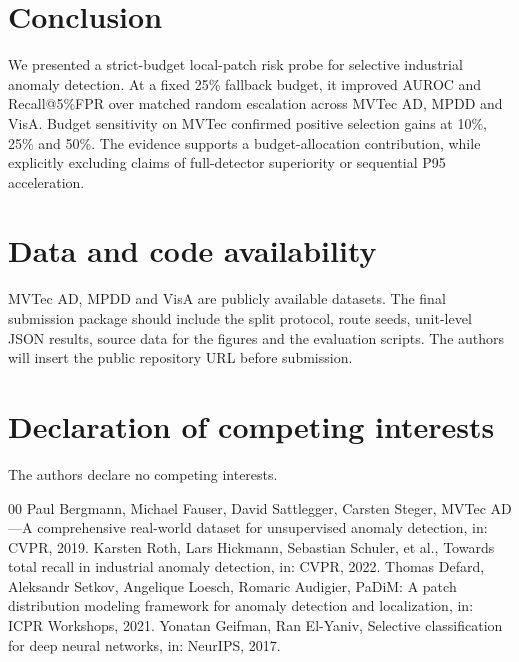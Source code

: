 \documentclass[preprint,12pt]{elsarticle}
\begin{document}
\section{Conclusion}
We presented a strict-budget local-patch risk probe for selective industrial anomaly detection. At a fixed 25\% fallback budget, it improved AUROC and Recall@5\%FPR over matched random escalation across MVTec AD, MPDD and VisA. Budget sensitivity on MVTec confirmed positive selection gains at 10\%, 25\% and 50\%. The evidence supports a budget-allocation contribution, while explicitly excluding claims of full-detector superiority or sequential P95 acceleration.

\section*{Data and code availability}
MVTec AD, MPDD and VisA are publicly available datasets. The final submission package should include the split protocol, route seeds, unit-level JSON results, source data for the figures and the evaluation scripts. The authors will insert the public repository URL before submission.

\section*{Declaration of competing interests}
The authors declare no competing interests.

\begin{thebibliography}{00}
 Paul Bergmann, Michael Fauser, David Sattlegger, Carsten Steger, MVTec AD---A comprehensive real-world dataset for unsupervised anomaly detection, in: CVPR, 2019.
 Karsten Roth, Lars Hickmann, Sebastian Schuler, et al., Towards total recall in industrial anomaly detection, in: CVPR, 2022.
 Thomas Defard, Aleksandr Setkov, Angelique Loesch, Romaric Audigier, PaDiM: A patch distribution modeling framework for anomaly detection and localization, in: ICPR Workshops, 2021.
 Yonatan Geifman, Ran El-Yaniv, Selective classification for deep neural networks, in: NeurIPS, 2017.
\end{thebibliography}
\end{document}

